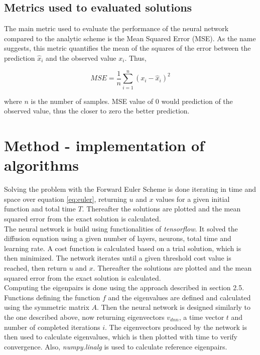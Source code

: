 \documentclass[a4paper,11pt,twocolumn]{article}
\begin{document}
\subsection{Metrics used to evaluated solutions}

The main metric used to evaluate the performance of the neural network compared to the analytic scheme is the Mean Squared Error (MSE). As the name suggests, this metric quantifies the mean of the squares of the error between the prediction $\hat{x}_i$ and the observed value $x_i$. Thus, 

\begin{equation*}
MSE = \frac{1}{n}\sum_{i=1}^n (x_i - \hat{x}_i)^2
\end{equation*}

where $n$ is the number of samples. MSE value of 0 would prediction of the observed value, thus the closer to zero the better prediction.  
 

\section{Method - implementation of algorithms}
Solving the problem with the Forward Euler Scheme is done iterating in time and space over equation \eqref{eq:euler}, returning $u$ and $x$ values for a given initial function and total time $T$. Thereafter the solutions are plotted and the mean squared error from the exact solution is calculated. 
\\
The neural network is build using functionalities of \textit{tensorflow}. It solved the diffusion equation using a given number of layers, neurons, total time and learning rate. A cost function is calculated based on a trial solution, which is then minimized. The network iterates until a given threshold cost value is reached, then return $u$ and $x$. Thereafter the solutions are plotted and the mean squared error from the exact solution is calculated.  
\\
Computing the eigenpairs is done using the approach described in section 2.5. Functions defining the function $f$ and the eigenvalues are defined and calculated using the symmetric matrix $A$. Then the neural network is designed similarly to the one described above, now returning eigenvectors $v_{dnn}$, a time vector $t$ and number of completed iterations $i$. The eigenvectors produced by the network is then used to calculate eigenvalues, which is then plotted with time to verify convergence. Also, \textit{numpy.linalg} is used to calculate reference eigenpairs. 
\end{document}
